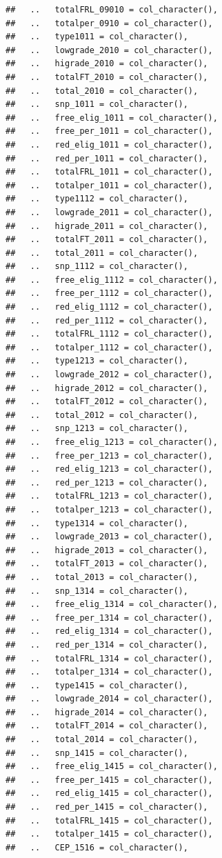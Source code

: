 \documentclass[
]{book}
\begin{document}
\begin{verbatim}
##   ..   totalFRL_09010 = col_character(),
##   ..   totalper_0910 = col_character(),
##   ..   type1011 = col_character(),
##   ..   lowgrade_2010 = col_character(),
##   ..   higrade_2010 = col_character(),
##   ..   totalFT_2010 = col_character(),
##   ..   total_2010 = col_character(),
##   ..   snp_1011 = col_character(),
##   ..   free_elig_1011 = col_character(),
##   ..   free_per_1011 = col_character(),
##   ..   red_elig_1011 = col_character(),
##   ..   red_per_1011 = col_character(),
##   ..   totalFRL_1011 = col_character(),
##   ..   totalper_1011 = col_character(),
##   ..   type1112 = col_character(),
##   ..   lowgrade_2011 = col_character(),
##   ..   higrade_2011 = col_character(),
##   ..   totalFT_2011 = col_character(),
##   ..   total_2011 = col_character(),
##   ..   snp_1112 = col_character(),
##   ..   free_elig_1112 = col_character(),
##   ..   free_per_1112 = col_character(),
##   ..   red_elig_1112 = col_character(),
##   ..   red_per_1112 = col_character(),
##   ..   totalFRL_1112 = col_character(),
##   ..   totalper_1112 = col_character(),
##   ..   type1213 = col_character(),
##   ..   lowgrade_2012 = col_character(),
##   ..   higrade_2012 = col_character(),
##   ..   totalFT_2012 = col_character(),
##   ..   total_2012 = col_character(),
##   ..   snp_1213 = col_character(),
##   ..   free_elig_1213 = col_character(),
##   ..   free_per_1213 = col_character(),
##   ..   red_elig_1213 = col_character(),
##   ..   red_per_1213 = col_character(),
##   ..   totalFRL_1213 = col_character(),
##   ..   totalper_1213 = col_character(),
##   ..   type1314 = col_character(),
##   ..   lowgrade_2013 = col_character(),
##   ..   higrade_2013 = col_character(),
##   ..   totalFT_2013 = col_character(),
##   ..   total_2013 = col_character(),
##   ..   snp_1314 = col_character(),
##   ..   free_elig_1314 = col_character(),
##   ..   free_per_1314 = col_character(),
##   ..   red_elig_1314 = col_character(),
##   ..   red_per_1314 = col_character(),
##   ..   totalFRL_1314 = col_character(),
##   ..   totalper_1314 = col_character(),
##   ..   type1415 = col_character(),
##   ..   lowgrade_2014 = col_character(),
##   ..   higrade_2014 = col_character(),
##   ..   totalFT_2014 = col_character(),
##   ..   total_2014 = col_character(),
##   ..   snp_1415 = col_character(),
##   ..   free_elig_1415 = col_character(),
##   ..   free_per_1415 = col_character(),
##   ..   red_elig_1415 = col_character(),
##   ..   red_per_1415 = col_character(),
##   ..   totalFRL_1415 = col_character(),
##   ..   totalper_1415 = col_character(),
##   ..   CEP_1516 = col_character(),

\end{verbatim}
\end{document}
